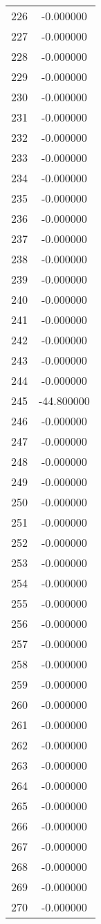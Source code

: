 \documentclass[12pt]{article}
\begin{document}
\begin{longtable}{@{}cc@{}}
226 & -0.000000 \\
227 & -0.000000 \\
228 & -0.000000 \\
229 & -0.000000 \\
230 & -0.000000 \\
231 & -0.000000 \\
232 & -0.000000 \\
233 & -0.000000 \\
234 & -0.000000 \\
235 & -0.000000 \\
236 & -0.000000 \\
237 & -0.000000 \\
238 & -0.000000 \\
239 & -0.000000 \\
240 & -0.000000 \\
241 & -0.000000 \\
242 & -0.000000 \\
243 & -0.000000 \\
244 & -0.000000 \\
245 & -44.800000 \\
246 & -0.000000 \\
247 & -0.000000 \\
248 & -0.000000 \\
249 & -0.000000 \\
250 & -0.000000 \\
251 & -0.000000 \\
252 & -0.000000 \\
253 & -0.000000 \\
254 & -0.000000 \\
255 & -0.000000 \\
256 & -0.000000 \\
257 & -0.000000 \\
258 & -0.000000 \\
259 & -0.000000 \\
260 & -0.000000 \\
261 & -0.000000 \\
262 & -0.000000 \\
263 & -0.000000 \\
264 & -0.000000 \\
265 & -0.000000 \\
266 & -0.000000 \\
267 & -0.000000 \\
268 & -0.000000 \\
269 & -0.000000 \\
270 & -0.000000 \\

\end{longtable}
\end{document}
